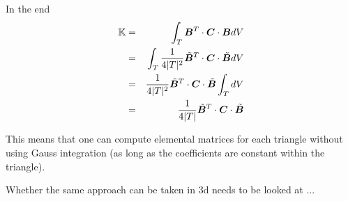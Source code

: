 In the end 
\begin{eqnarray}
{\mathbb{K}} 
&=& \int_T {\bm B}^T \cdot {\bm C} \cdot {\bm B} dV \nonumber\\
&=& \int_T \frac{1}{4|T|^2} \tilde{\bm B}^T \cdot {\bm C} \cdot \tilde {\bm B} dV \nonumber\\
&=&  \frac{1}{4|T|^2}  \tilde{\bm B}^T \cdot {\bm C} \cdot \tilde {\bm B} \int_T dV \nonumber\\
&=&  \frac{1}{4|T|}  \tilde{\bm B}^T \cdot {\bm C} \cdot \tilde {\bm B} 
\end{eqnarray}

This means that one can compute elemental matrices for each triangle
without using Gauss integration (as long as the coefficients are 
constant within the triangle).

Whether the same approach can be taken in 3d needs to be looked at ...









